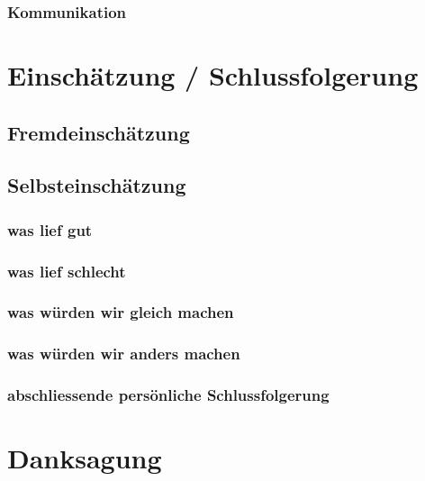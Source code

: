 \documentclass[a4paper,11pt]{article}
\begin{document}
\subsubsection{Kommunikation}

\section{Einschätzung / Schlussfolgerung}

\subsection{Fremdeinschätzung}
\subsection{Selbsteinschätzung}
\subsubsection{was lief gut}
\subsubsection{was lief schlecht}
\subsubsection{was würden wir gleich machen}
\subsubsection{was würden wir anders machen}
\subsubsection{abschliessende persönliche Schlussfolgerung}

\section{Danksagung}
\end{document}
